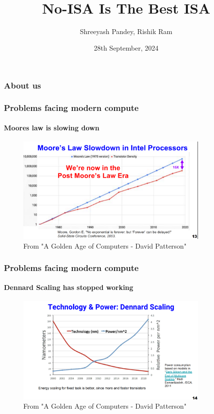 \documentclass{beamer}
\title{No-ISA Is The Best ISA}
\subtitle{}
\author{Shreeyash Pandey, Rishik Ram}
\institute{Vicharak, India @ vicharak.in}
\date{28th September, 2024}
\begin{document}
\begin{frame}
\titlepage
\end{frame}

\begin{frame}[fragile]
\frametitle{About us}

\framesubtitle{}
\end{frame}

\begin{frame}[fragile]
\frametitle{Problems facing modern compute}
\framesubtitle{Moores law is slowing down}

  \begin{figure}
    \centering
    \includegraphics[width=0.85\textwidth]{mooreslaw.png}
    \caption{From "A Golden Age of Computers - David Patterson"}
  \end{figure}

\end{frame}

\begin{frame}[fragile]
\frametitle{Problems facing modern compute}
  \framesubtitle{Dennard Scaling has stopped working}

  \begin{figure}
    \centering
    \includegraphics[width=0.85\textwidth]{dennardscaling.png}
    \caption{From "A Golden Age of Computers - David Patterson"}
  \end{figure}
\end{frame}
\end{document}
